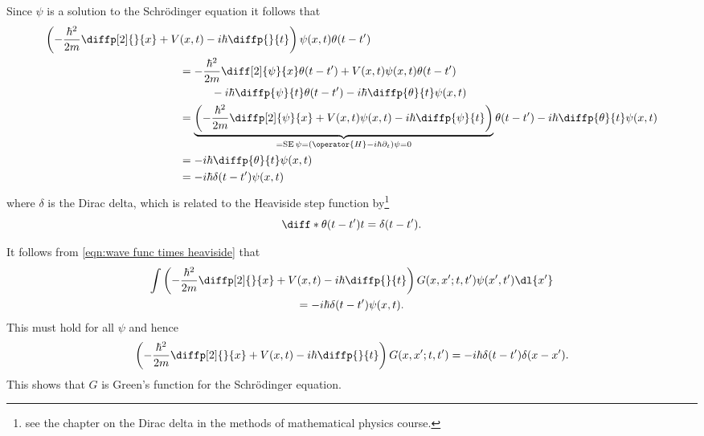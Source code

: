 \documentclass[fleqn]{NotesClass}
\DeclareMathOperator{\SE}{SE}
\begin{document}
    Since \(\psi\) is a solution to the Schr\"odinger equation it follows that
    \begin{align}
        \left( -\frac{\hbar^2}{2m} \diffp[2]{}{x} + V(x, t) - i\hbar\diffp{}{t} \right) \psi(x, t)\theta(t - t') &\\
        &\hspace{-6cm}= -\frac{\hbar^2}{2m}\diff[2]{\psi}{x}\theta(t - t') + V(x, t)\psi(x, t)\theta(t - t')\\
        &\hspace{-5cm}- i\hbar\diffp{\psi}{t}\theta(t - t') - i\hbar\diffp{\theta}{t}\psi(x, t)\\
        &\hspace{-6cm}= \underbrace{\left( -\frac{\hbar^2}{2m}\diffp[2]{\psi}{x} + V(x, t)\psi(x, t) - i\hbar\diffp{\psi}{t} \right)}_{=\SE\psi = (\operator{H} - i\hbar\partial_t)\psi = 0}\theta(t - t') - i\hbar\diffp{\theta}{t}\psi(x, t)\\
        &\hspace{-6cm}= -i\hbar\diffp{\theta}{t}\psi(x, t)\\
        &\hspace{-6cm}= -i\hbar\delta(t - t')\psi(x, t)
    \end{align}
    where \(\delta\) is the Dirac delta, which is related to the Heaviside step function by\footnote{see the chapter on the Dirac delta in the methods of mathematical physics course.}
    \begin{equation}
        \diff*{\theta(t - t')}{t} = \delta(t - t').
    \end{equation}
    
    It follows from \cref{eqn:wave func times heaviside} that
    \begin{multline}
        \int \left( -\frac{\hbar^2}{2m} \diffp[2]{}{x} + V(x, t) - i\hbar\diffp{}{t} \right) G(x, x'; t, t')\psi(x', t') \dl{x'}\\
        = -i\hbar\delta(t - t')\psi(x, t).
    \end{multline}
    This must hold for all \(\psi\) and hence
    \begin{equation}
        \left( -\frac{\hbar^2}{2m}\diffp[2]{}{x} + V(x, t) - i\hbar\diffp{}{t} \right)G(x, x'; t, t') = -i\hbar\delta(t - t')\delta(x - x').
    \end{equation}
    This shows that \(G\) is Green's function for the Schr\"odinger equation.
    
\end{document}
